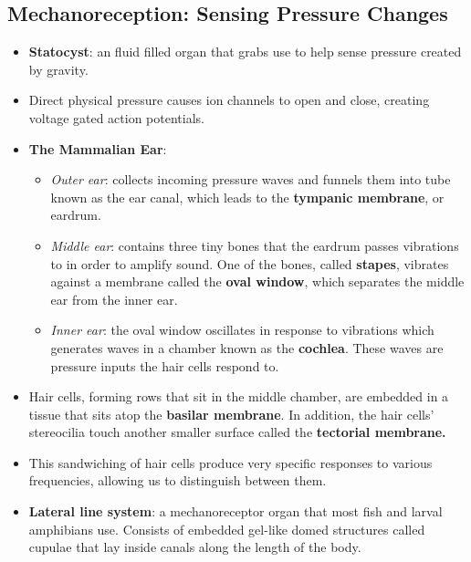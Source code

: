 \documentclass[12pt,a4paper]{article}
\begin{document}
\subsection{Mechanoreception: Sensing Pressure Changes}
\begin{itemize}
     \item \textbf{Statocyst}: an fluid filled organ that grabs use to help sense pressure created by gravity.
    \item Direct physical pressure causes ion channels to open and close, creating voltage gated action potentials.
    \item \textbf{The Mammalian Ear}:
    \begin{itemize}
        \item \textit{Outer ear}: collects incoming pressure waves and funnels them into tube known as the ear canal, which leads to the \textbf{tympanic membrane}, or eardrum.
        \item \textit{Middle ear}: contains three tiny bones that the eardrum passes vibrations to in order to amplify sound. One of the bones, called \textbf{stapes}, vibrates against a membrane called the \textbf{oval window}, which separates the middle ear from the inner ear.
        \item \textit{Inner ear}: the oval window oscillates in response to vibrations which generates waves in a chamber known as the \textbf{cochlea}. These waves are pressure inputs the hair cells respond to.
    \end{itemize}
    \item Hair cells, forming rows that sit in the middle chamber, are embedded in a tissue that sits atop the \textbf{basilar membrane}. In addition, the hair cells' stereocilia touch another smaller surface called the \textbf{tectorial membrane.}
    \item This sandwiching of hair cells produce very specific responses to various frequencies, allowing us to distinguish between them. 
    \item \textbf{Lateral line system}: a mechanoreceptor organ that most fish and larval amphibians use. Consists of embedded gel-like domed structures called cupulae that lay inside canals along the length of the body. 
\end{itemize}
\end{document}

